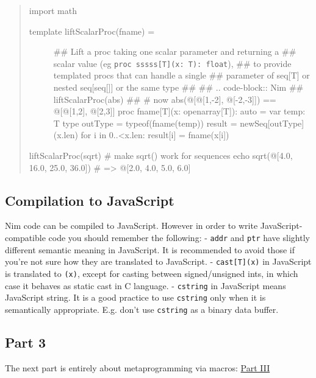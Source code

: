 \begin{verbatim}
\end{verbatim}

\begin{quote}
import math

\begin{description}
\item[template liftScalarProc(fname) =]
\#\# Lift a proc taking one scalar parameter and returning a \#\# scalar
value (eg \texttt{proc\ sssss{[}T{]}(x:\ T):\ float}), \#\# to provide
templated procs that can handle a single \#\# parameter of seq{[}T{]} or
nested seq{[}seq{[}{]}{]} or the same type \#\# \#\# .. code-block:: Nim
\#\# liftScalarProc(abs) \#\# \# now abs(@{[}@{[}1,-2{]},
@{[}-2,-3{]}{]}) == @{[}@{[}1,2{]}, @{[}2,3{]}{]} proc fname{[}T{]}(x:
openarray{[}T{]}): auto = var temp: T type outType = typeof(fname(temp))
result = newSeq{[}outType{]}(x.len) for i in 0..\textless x.len:
result{[}i{]} = fname(x{[}i{]})
\end{description}

liftScalarProc(sqrt) \# make sqrt() work for sequences echo
sqrt(@{[}4.0, 16.0, 25.0, 36.0{]}) \# =\textgreater{} @{[}2.0, 4.0, 5.0,
6.0{]}
\end{quote}

\hypertarget{compilation-to-javascript}{%
\subsection{Compilation to JavaScript}\label{compilation-to-javascript}}

Nim code can be compiled to JavaScript. However in order to write
JavaScript-compatible code you should remember the following: -
\texttt{addr} and \texttt{ptr} have slightly different semantic meaning
in JavaScript. It is recommended to avoid those if you're not sure how
they are translated to JavaScript. - \texttt{cast{[}T{]}(x)} in
JavaScript is translated to \texttt{(x)}, except for casting between
signed/unsigned ints, in which case it behaves as static cast in C
language. - \texttt{cstring} in JavaScript means JavaScript string. It
is a good practice to use \texttt{cstring} only when it is semantically
appropriate. E.g. don't use \texttt{cstring} as a binary data buffer.

\hypertarget{part-3}{%
\subsection{Part 3}\label{part-3}}

The next part is entirely about metaprogramming via macros:
\href{tut3.html}{Part III}
